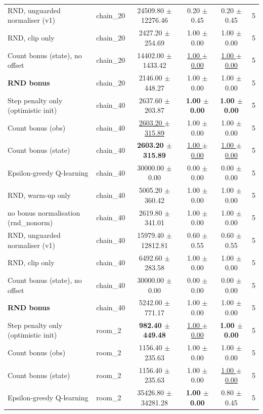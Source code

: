 \begin{tabular}{llcccc}
RND, unguarded normaliser (v1) & chain\_20 & 24509.80 $\pm$ 12276.46 & 0.20 $\pm$ 0.45 & 0.20 $\pm$ 0.45 & 5 \\
RND, clip only & chain\_20 & 2427.20 $\pm$ 254.69 & 1.00 $\pm$ 0.00 & 1.00 $\pm$ 0.00 & 5 \\
Count bonus (state), no offset & chain\_20 & 14402.00 $\pm$ 1433.42 & \underline{1.00 $\pm$ 0.00} & \underline{1.00 $\pm$ 0.00} & 5 \\
\textbf{RND bonus} & chain\_20 & 2146.00 $\pm$ 448.27 & 1.00 $\pm$ 0.00 & 1.00 $\pm$ 0.00 & 5 \\
\midrule
Step penalty only (optimistic init) & chain\_40 & 2637.60 $\pm$ 203.87 & \textbf{1.00 $\pm$ 0.00} & \textbf{1.00 $\pm$ 0.00} & 5 \\
Count bonus (obs) & chain\_40 & \underline{2603.20 $\pm$ 315.89} & 1.00 $\pm$ 0.00 & 1.00 $\pm$ 0.00 & 5 \\
Count bonus (state) & chain\_40 & \textbf{2603.20 $\pm$ 315.89} & \underline{1.00 $\pm$ 0.00} & \underline{1.00 $\pm$ 0.00} & 5 \\
Epsilon-greedy Q-learning & chain\_40 & 30000.00 $\pm$ 0.00 & 0.00 $\pm$ 0.00 & 0.00 $\pm$ 0.00 & 5 \\
RND, warm-up only & chain\_40 & 5005.20 $\pm$ 360.42 & 1.00 $\pm$ 0.00 & 1.00 $\pm$ 0.00 & 5 \\
no bonus normalisation (rnd\_nonorm) & chain\_40 & 2619.80 $\pm$ 341.01 & 1.00 $\pm$ 0.00 & 1.00 $\pm$ 0.00 & 5 \\
RND, unguarded normaliser (v1) & chain\_40 & 15979.40 $\pm$ 12812.81 & 0.60 $\pm$ 0.55 & 0.60 $\pm$ 0.55 & 5 \\
RND, clip only & chain\_40 & 6492.60 $\pm$ 283.58 & 1.00 $\pm$ 0.00 & 1.00 $\pm$ 0.00 & 5 \\
Count bonus (state), no offset & chain\_40 & 30000.00 $\pm$ 0.00 & 0.00 $\pm$ 0.00 & 0.00 $\pm$ 0.00 & 5 \\
\textbf{RND bonus} & chain\_40 & 5242.00 $\pm$ 771.17 & 1.00 $\pm$ 0.00 & 1.00 $\pm$ 0.00 & 5 \\
\midrule
Step penalty only (optimistic init) & room\_2 & \textbf{982.40 $\pm$ 449.48} & \underline{1.00 $\pm$ 0.00} & \textbf{1.00 $\pm$ 0.00} & 5 \\
Count bonus (obs) & room\_2 & 1156.40 $\pm$ 235.63 & 1.00 $\pm$ 0.00 & 1.00 $\pm$ 0.00 & 5 \\
Count bonus (state) & room\_2 & 1156.40 $\pm$ 235.63 & 1.00 $\pm$ 0.00 & \underline{1.00 $\pm$ 0.00} & 5 \\
Epsilon-greedy Q-learning & room\_2 & 35426.80 $\pm$ 34281.28 & \textbf{1.00 $\pm$ 0.00} & 0.80 $\pm$ 0.45 & 5 \\

\end{tabular}
